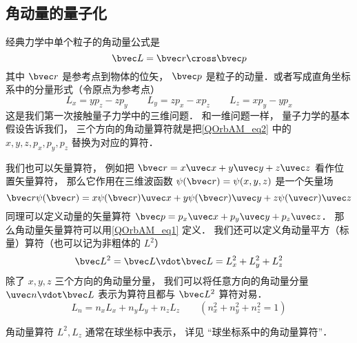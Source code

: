 
\begin{issues}
\issueDraft
\issueMissDepend
\end{issues}


\subsection{角动量的量子化}

经典力学中单个粒子的角动量公式是
\begin{equation}\label{QOrbAM_eq1}
\bvec L = \bvec r \cross \bvec p
\end{equation}
其中 $\bvec r$ 是参考点到物体的位矢， $\bvec p$ 是粒子的动量．或者写成直角坐标系中的分量形式（令原点为参考点）
\begin{equation}\label{QOrbAM_eq2}
L_x = y p_z - z p_y \qquad
L_y = z p_x - x p_z \qquad
L_z = x p_y - y p_x
\end{equation}   
这是我们第一次接触量子力学中的三维问题． 和一维问题一样， 量子力学的基本假设告诉我们， 三个方向的角动量算符就是把\autoref{QOrbAM_eq2} 中的 $x, y, z, p_x, p_y, p_z$ 替换为对应的算符．

我们也可以矢量算符， 例如把 $\bvec r = x\uvec x + y\uvec y + z\uvec z$ 看作位置矢量算符， 那么它作用在三维波函数 $\psi(\bvec r) = \psi(x, y, z)$ 是一个矢量场
\begin{equation}
\bvec r \psi(\bvec r) = x \psi(\bvec r) \uvec x + y \psi(\bvec r) \uvec y + z \psi(\uvec r) \uvec z
\end{equation}
同理可以定义动量的矢量算符 $\bvec p = p_x \uvec x + p_y\uvec y + p_z\uvec z$． 那么角动量矢量算符可以用\autoref{QOrbAM_eq1} 定义． 我们还可以定义角动量平方（标量）算符（也可以记为非粗体的 $L^2$）
\begin{equation}
\bvec L^2 = \bvec L \vdot \bvec L = L_x^2 + L_y^2 + L_z^2
\end{equation}
除了 $x, y, z$ 三个方向的角动量分量， 我们可以将任意方向的角动量分量 $\uvec n \vdot \bvec L$ 表示为算符且都与 $\bvec L^2$ 算符对易．
\begin{equation}
L_n = n_x L_x + n_y L_y + n_z L_z \qquad (n_x^2 + n_y^2 + n_z^2 = 1)
\end{equation}

角动量算符 $L^2, L_z$ 通常在球坐标中表示， 详见 “球坐标系中的角动量算符”．

